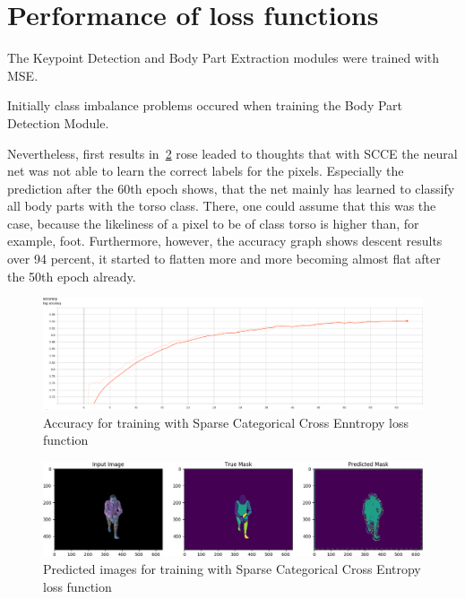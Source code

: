 

\section{Performance of loss functions}

The Keypoint Detection and Body Part Extraction modules were trained with MSE.

Initially class imbalance problems occured when training the Body Part Detection Module.

Nevertheless, first results in~\ref{fig:cross_entropy_pred_img} rose leaded to thoughts that with \gls{SCCE} the
neural net was not able to
learn the correct labels for the pixels.
Especially the prediction after the 60th epoch shows, that the net mainly has learned to classify all body parts with
the
torso class.
There, one could assume that this was the case, because the likeliness of a pixel to be of class torso is higher
than, for
example, foot.
Furthermore, however, the accuracy graph shows descent results over 94 percent, it started to flatten more and more
becoming
almost flat after the 50th epoch already.
\begin{figure}[H]
    \centering
    \includegraphics[width=\textwidth,height=\textheight,keepaspectratio]{Figures/accuracy_cross_entropy.png}
    \decoRule
    \caption[Loss Functions SCCE: Accuracy]{Accuracy for training with Sparse Categorical Cross Enntropy loss function}
    \label{fig:accuracy_cross_entropy}
\end{figure}
\begin{figure}[H]
    \centering
    \includegraphics[width=\textwidth,height=\textheight,keepaspectratio]{Figures/crossentropy_imgs_prediction_last_epoch.png}
    \decoRule
    \caption[Loss Functions SCCE: predictions]{Predicted images for training with Sparse Categorical Cross Entropy loss function}
    \label{fig:cross_entropy_pred_img}
\end{figure}
